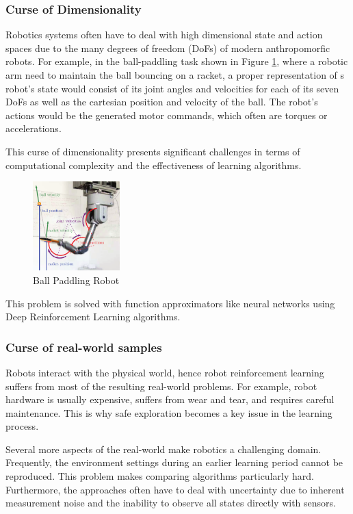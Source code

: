 \subsubsection{Curse of Dimensionality}
Robotics systems often have to deal with high dimensional state and action spaces due to the many degrees of freedom (DoFs) of modern
anthropomorfic robots. For example, in the ball-paddling task shown in Figure \ref{fig:ball_paddling_robot}, where a robotic arm need to maintain the ball bouncing on a racket, a proper representation
of s robot's state would consist of its joint angles and velocities for each of its seven DoFs as well as the cartesian position
and velocity of the ball. The robot's actions would be the generated motor commands, which often are torques or accelerations.

This curse of dimensionality presents significant challenges in terms of computational complexity 
and the effectiveness of learning algorithms.

\begin{figure}[H]
    \centering
    \includegraphics[width=0.3\textwidth]{Images/ball_paddling.png}
    \caption{Ball Paddling Robot}
    \label{fig:ball_paddling_robot}
\end{figure}

This problem is solved with function approximators like neural networks using Deep Reinforcement Learning algorithms.

\subsubsection{Curse of real-world samples}
Robots interact with the physical world, hence robot reinforcement learning suffers from most of the resulting real-world problems.
For example, robot hardware is usually expensive, suffers from wear and tear, and requires careful maintenance. This is why safe exploration
becomes a key issue in the learning process.

Several more aspects of the real-world make robotics a challenging domain. Frequently, the environment settings during an earlier 
learning period cannot be reproduced. This problem makes comparing algorithms particularly hard. Furthermore, the approaches often have to deal 
with uncertainty due to inherent measurement noise and the inability to observe all states directly with sensors.

